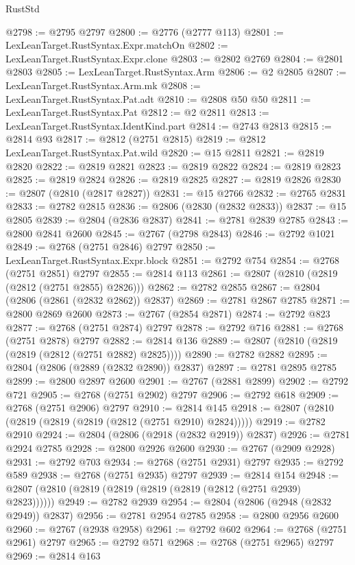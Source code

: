\begin{lexlean}{RustStd}
\begin{coremodule}
@2798 := @2795 @2797
@2800 := @2776 (@2777 @113)
@2801 := LexLeanTarget.RustSyntax.Expr.matchOn
@2802 := LexLeanTarget.RustSyntax.Expr.clone
@2803 := @2802 @2769
@2804 := @2801 @2803
@2805 := LexLeanTarget.RustSyntax.Arm
@2806 := @2 @2805
@2807 := LexLeanTarget.RustSyntax.Arm.mk
@2808 := LexLeanTarget.RustSyntax.Pat.adt
@2810 := @2808 @50 @50
@2811 := LexLeanTarget.RustSyntax.Pat
@2812 := @2 @2811
@2813 := LexLeanTarget.RustSyntax.IdentKind.part
@2814 := @2743 @2813
@2815 := @2814 @93
@2817 := @2812 (@2751 @2815)
@2819 := @2812 LexLeanTarget.RustSyntax.Pat.wild
@2820 := @15 @2811
@2821 := @2819 @2820
@2822 := @2819 @2821
@2823 := @2819 @2822
@2824 := @2819 @2823
@2825 := @2819 @2824
@2826 := @2819 @2825
@2827 := @2819 @2826
@2830 := @2807 (@2810 (@2817 @2827))
@2831 := @15 @2766
@2832 := @2765 @2831
@2833 := @2782 @2815
@2836 := @2806 (@2830 (@2832 @2833))
@2837 := @15 @2805
@2839 := @2804 (@2836 @2837)
@2841 := @2781 @2839 @2785
@2843 := @2800 @2841 @2600
@2845 := @2767 (@2798 @2843)
@2846 := @2792 @1021
@2849 := @2768 (@2751 @2846) @2797
@2850 := LexLeanTarget.RustSyntax.Expr.block
@2851 := @2792 @754
@2854 := @2768 (@2751 @2851) @2797
@2855 := @2814 @113
@2861 := @2807 (@2810 (@2819 (@2812 (@2751 @2855) @2826)))
@2862 := @2782 @2855
@2867 := @2804 (@2806 (@2861 (@2832 @2862)) @2837)
@2869 := @2781 @2867 @2785
@2871 := @2800 @2869 @2600
@2873 := @2767 (@2854 @2871)
@2874 := @2792 @823
@2877 := @2768 (@2751 @2874) @2797
@2878 := @2792 @716
@2881 := @2768 (@2751 @2878) @2797
@2882 := @2814 @136
@2889 := @2807 (@2810 (@2819 (@2819 (@2812 (@2751 @2882) @2825))))
@2890 := @2782 @2882
@2895 := @2804 (@2806 (@2889 (@2832 @2890)) @2837)
@2897 := @2781 @2895 @2785
@2899 := @2800 @2897 @2600
@2901 := @2767 (@2881 @2899)
@2902 := @2792 @721
@2905 := @2768 (@2751 @2902) @2797
@2906 := @2792 @618
@2909 := @2768 (@2751 @2906) @2797
@2910 := @2814 @145
@2918 := @2807 (@2810 (@2819 (@2819 (@2819 (@2812 (@2751 @2910) @2824)))))
@2919 := @2782 @2910
@2924 := @2804 (@2806 (@2918 (@2832 @2919)) @2837)
@2926 := @2781 @2924 @2785
@2928 := @2800 @2926 @2600
@2930 := @2767 (@2909 @2928)
@2931 := @2792 @703
@2934 := @2768 (@2751 @2931) @2797
@2935 := @2792 @589
@2938 := @2768 (@2751 @2935) @2797
@2939 := @2814 @154
@2948 := @2807 (@2810 (@2819 (@2819 (@2819 (@2819 (@2812 (@2751 @2939) @2823))))))
@2949 := @2782 @2939
@2954 := @2804 (@2806 (@2948 (@2832 @2949)) @2837)
@2956 := @2781 @2954 @2785
@2958 := @2800 @2956 @2600
@2960 := @2767 (@2938 @2958)
@2961 := @2792 @602
@2964 := @2768 (@2751 @2961) @2797
@2965 := @2792 @571
@2968 := @2768 (@2751 @2965) @2797
@2969 := @2814 @163

\end{coremodule}
\end{lexlean}
